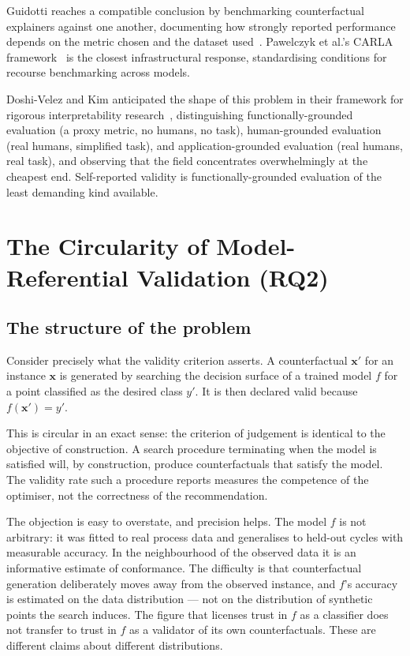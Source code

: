 \documentclass[11pt,a4paper]{article}
\begin{document}
Guidotti reaches a compatible conclusion by benchmarking counterfactual explainers against one another, documenting how strongly reported performance depends on the metric chosen and the dataset used~\cite{guidotti2024}. Pawelczyk et al.'s CARLA framework~\cite{pawelczyk2021} is the closest infrastructural response, standardising conditions for recourse benchmarking across models.

Doshi-Velez and Kim anticipated the shape of this problem in their framework for rigorous interpretability research~\cite{doshivelez2017}, distinguishing functionally-grounded evaluation (a proxy metric, no humans, no task), human-grounded evaluation (real humans, simplified task), and application-grounded evaluation (real humans, real task), and observing that the field concentrates overwhelmingly at the cheapest end. Self-reported validity is functionally-grounded evaluation of the least demanding kind available.

\section{The Circularity of Model-Referential Validation (RQ2)}\label{sec:circularity}

\subsection{The structure of the problem}

Consider precisely what the validity criterion asserts. A counterfactual $\mathbf{x}'$ for an instance $\mathbf{x}$ is generated by searching the decision surface of a trained model $f$ for a point classified as the desired class $y'$. It is then declared valid because $f(\mathbf{x}') = y'$.

This is circular in an exact sense: the criterion of judgement is identical to the objective of construction. A search procedure terminating when the model is satisfied will, by construction, produce counterfactuals that satisfy the model. The validity rate such a procedure reports measures the competence of the optimiser, not the correctness of the recommendation.

The objection is easy to overstate, and precision helps. The model $f$ is not arbitrary: it was fitted to real process data and generalises to held-out cycles with measurable accuracy. In the neighbourhood of the observed data it is an informative estimate of conformance. The difficulty is that counterfactual generation deliberately moves away from the observed instance, and $f$'s accuracy is estimated on the data distribution --- not on the distribution of synthetic points the search induces. The figure that licenses trust in $f$ as a classifier does not transfer to trust in $f$ as a validator of its own counterfactuals. These are different claims about different distributions.
\end{document}
